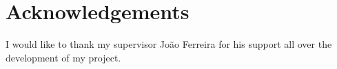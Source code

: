 \part{Acknowledgements}

I would like to thank my supervisor Jo\~{a}o Ferreira for his support all over the development of my project.


\clearpage